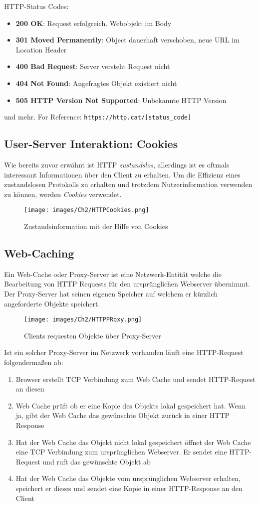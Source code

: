 HTTP-Status Codes:
\begin{itemize}
    \item \textbf{200 OK}: Request erfolgreich. Webobjekt im Body
    \item \textbf{301 Moved Permanently}: Object dauerhaft verschoben, neue URL im Location Header
    \item \textbf{400 Bad Request}: Server versteht Request nicht
    \item \textbf{404 Not Found}: Angefragtes Objekt existiert nicht
    \item \textbf{505 HTTP Version Not Supported}: Unbekannte HTTP Version
\end{itemize}
und mehr. For Reference: \lstinline{https://http.cat/[status_code]}

\subsection{User-Server Interaktion: Cookies}
Wie bereits zuvor erwähnt ist HTTP \emph{zustandslos}, allerdings ist es oftmals interessant Informationen über den Client zu erhalten. Um die Effizienz eines zustandslosen Protokolls zu erhalten und trotzdem Nutzerinformation verwenden zu können, werden \emph{Cookies} verwendet.

\begin{figure}[H]
    \centering
    \texttt{[image: images/Ch2/HTTPCookies.png]}
    \caption{Zustandsinformation mit der Hilfe von Cookies}
\end{figure}


\subsection{Web-Caching}
Ein Web-Cache oder Proxy-Server ist eine Netzwerk-Entität welche die Bearbeitung von HTTP Requests für den ursprünglichen Webserver übernimmt. Der Proxy-Server hat seinen eigenen Speicher auf welchem er kürzlich angeforderte Objekte speichert.

\begin{figure}[H]
    \centering
    \texttt{[image: images/Ch2/HTTPPRoxy.png]}
    \caption{Clients requesten Objekte über Proxy-Server}
\end{figure}
Ist ein solcher Proxy-Server im Netzwerk vorhanden läuft eine HTTP-Request folgendermaßen ab:
\begin{enumerate}
    \item Browser erstellt TCP Verbindung zum Web Cache und sendet HTTP-Request an diesen
    \item Web Cache prüft ob er eine Kopie des Objekts lokal gespeichert hat. Wenn ja, gibt der Web Cache das gewünschte Objekt zurück in einer HTTP Response
    \item Hat der Web Cache das Objekt nicht lokal gespeichert öffnet der Web Cache eine TCP Verbindung zum ursprünglichen Webserver. Er sendet eine HTTP-Request und ruft das gewünschte Objekt ab
    \item Hat der Web Cache das Objekte vom ursprünglichen Webserver erhalten, speichert er dieses und sendet eine Kopie in einer HTTP-Response an den Client 
\end{enumerate}

